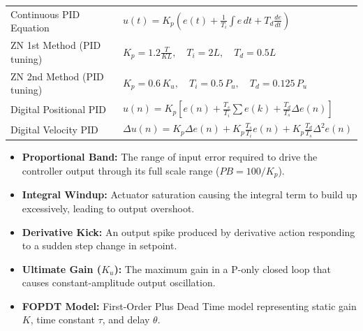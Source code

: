 \documentclass[12pt,a4paper]{article}
\renewcommand{\arraystretch}{1.45}
\begin{document}
\begin{tcolorbox}[formulabox, title={\textbf{Key Formulas at a Glance}}]
\renewcommand{\arraystretch}{1.35}
\begin{tabularx}{\linewidth}{B{5.2cm} X}
Continuous PID Equation & $u(t) = K_p \left( e(t) + \frac{1}{T_i} \int e\,dt + T_d \frac{de}{dt} \right)$ \\[4pt]
ZN 1st Method (PID tuning) & $K_p = 1.2 \frac{T}{KL}, \quad T_i = 2L, \quad T_d = 0.5L$ \\[4pt]
ZN 2nd Method (PID tuning) & $K_p = 0.6\,K_u, \quad T_i = 0.5\,P_u, \quad T_d = 0.125\,P_u$ \\[4pt]
Digital Positional PID & $u(n) = K_p \left[ e(n) + \frac{T_s}{T_i}\sum e(k) + \frac{T_d}{T_s}\Delta e(n) \right]$ \\[4pt]
Digital Velocity PID & $\Delta u(n) = K_p \Delta e(n) + K_p \frac{T_s}{T_i} e(n) + K_p \frac{T_d}{T_s} \Delta^2 e(n)$ \\
\end{tabularx}
\end{tcolorbox}

\begin{tcolorbox}[defbox, title={\textbf{One-Line Definitions}}]
\begin{itemize}[leftmargin=*, itemsep=2pt, topsep=0pt]
  \item \textbf{Proportional Band:} The range of input error required to drive the controller output through its full scale range ($PB = 100/K_p$).
  \item \textbf{Integral Windup:} Actuator saturation causing the integral term to build up excessively, leading to output overshoot.
  \item \textbf{Derivative Kick:} An output spike produced by derivative action responding to a sudden step change in setpoint.
  \item \textbf{Ultimate Gain ($K_u$):} The maximum gain in a P-only closed loop that causes constant-amplitude output oscillation.
  \item \textbf{FOPDT Model:} First-Order Plus Dead Time model representing static gain $K$, time constant $\tau$, and delay $\theta$.
\end{itemize}
\end{tcolorbox}
\end{document}
